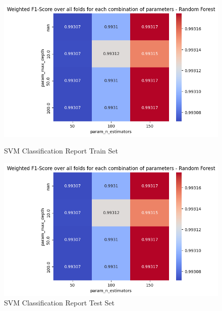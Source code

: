 \begin{figure}[H]
            \vspace{0.5cm}  %

            \begin{minipage}{\textwidth}
                \begin{minipage}[t]{0.48\textwidth}
                    \centering
                    \includegraphics[width=\textwidth]{../figures/plots/section2/weighted_f1_score_for_each_combination_of_parameters_random_forest.png}
                    \caption{SVM Classification Report Train Set}
                    \label{fig:}
                \end{minipage}%
                \hfill%
                \begin{minipage}[t]{0.48\textwidth}
                    \centering
                    \includegraphics[width=\textwidth]{../figures/plots/section2/weighted_f1_score_for_each_combination_of_parameters_random_forest.png}
                    \caption{SVM Classification Report Test Set}
                    \label{fig:}
                \end{minipage}  
            
            \end{minipage}
            
        \end{figure}
            